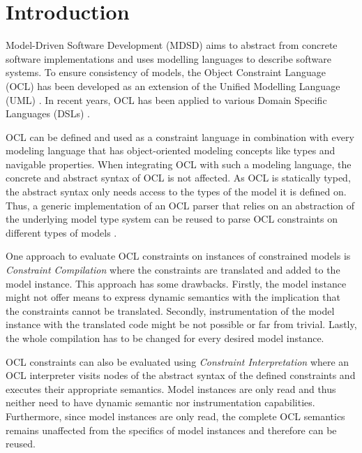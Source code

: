 \section{Introduction}

	Model-Driven Software Development (MDSD) aims to abstract from concrete 
	software implementations and uses modelling languages to describe 
	software systems. To ensure consistency of models, the Object Constraint Language 
	(OCL) \cite{spec:OCL2-2} has been developed as an extension of the Unified 
	Modelling Language (UML) \cite{spec:UML2-2}. In recent years, OCL has been 
	applied to various 
	Domain Specific Languages (DSLs) \cite{oclExample:DSL}. 

	OCL can be
	defined and used as a constraint language in combination
	with every modeling language that has 
	object-oriented modeling concepts like types and navigable properties.
	When integrating OCL with such a modeling language, the concrete and 
	abstract syntax of OCL is not affected. As OCL is statically
	typed, the abstract syntax only needs access to the types of the model 
	it is defined on. Thus, a generic implementation of an OCL parser
	that relies on an abstraction of the underlying model type system can be
	reused to parse OCL constraints on different types of
	models \cite{braeuerOCL07}.

	One approach to evaluate OCL constraints on instances 
	of constrained models is \textit{Constraint Compilation} where the constraints are 
	translated and added to the model instance. This approach has some drawbacks. 
	Firstly, the model instance might not offer means to express dynamic semantics with 
	the implication that the constraints cannot be translated. Secondly, 
	instrumentation of the model instance with the translated code might be not possible 
	or far from trivial. Lastly, the whole compilation has to be 	changed for every desired 
	model instance.
	
	OCL constraints can also be evaluated using \textit{Constraint Interpretation} where 
	an OCL interpreter visits nodes of the abstract syntax of the defined constraints and 
	executes their appropriate semantics. Model instances are only read and thus neither 
	need to have dynamic semantic nor instrumentation capabilities. Furthermore, 
	since model instances are only read, the complete OCL semantics remains 
	unaffected from the specifics of model instances and therefore can be reused.
	
